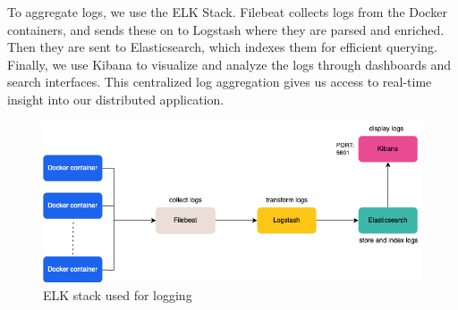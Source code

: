 To aggregate logs, we use the ELK Stack. Filebeat collects logs from the Docker containers, and sends these on to Logstash where they are parsed and enriched. Then they are sent to Elasticsearch, which indexes them for efficient querying. Finally, we use Kibana to visualize and analyze the logs through dashboards and search interfaces. This centralized log aggregation gives us access to real-time insight into our distributed application.

\begin{figure} [!htb]
    \centering
    \includegraphics[width=1.0\linewidth]{Images/ELK_diagram.drawio.png}
    \caption{ELK stack used for logging}
    \label{fig:dashboard}
\end{figure}


